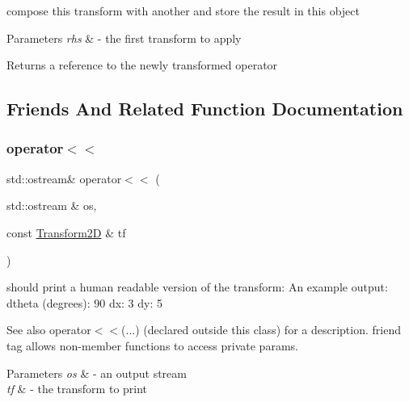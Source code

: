 compose this transform with another and store the result in this object 


\begin{DoxyParams}{Parameters}
{\em rhs} & -\/ the first transform to apply \\
\hline
\end{DoxyParams}
\begin{DoxyReturn}{Returns}
a reference to the newly transformed operator 
\end{DoxyReturn}


\subsection{Friends And Related Function Documentation}
\mbox{\label{classrigid2d_1_1Transform2D_ad5239a3fa3a0f9cebd73c39f34c2075f}} 
\subsubsection{\texorpdfstring{operator$<$$<$}{operator<<}}
{\footnotesize\ttfamily std\+::ostream\& operator$<$$<$ (\begin{DoxyParamCaption}\item[{std\+::ostream \&}]{os,  }\item[{const \hyperlink{classrigid2d_1_1Transform2D}{Transform2D} \&}]{tf }\end{DoxyParamCaption})\hspace{0.3cm}{\ttfamily [friend]}}



should print a human readable version of the transform\+: An example output\+: dtheta (degrees)\+: 90 dx\+: 3 dy\+: 5 

\begin{DoxySeeAlso}{See also}
operator$<$$<$(...) (declared outside this class) for a description. friend tag allows non-\/member functions to access private params.
\end{DoxySeeAlso}

\begin{DoxyParams}{Parameters}
{\em os} & -\/ an output stream \\
\hline
{\em tf} & -\/ the transform to print \\
\hline
\end{DoxyParams}
\mbox{\label{classrigid2d_1_1Transform2D_a7184f9b63deb3b10878054c34b02682b}} 

